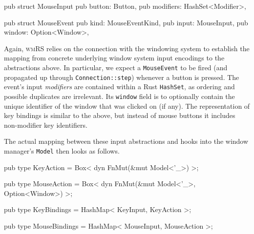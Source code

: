 \begin{rustblock}
  pub struct MouseInput {
    pub button: Button,
    pub modifiers: HashSet<Modifier>,
  }
\end{rustblock}

\begin{rustblock}
  pub struct MouseEvent {
    pub kind: MouseEventKind,
    pub input: MouseInput,
    pub window: Option<Window>,
  }
\end{rustblock}

Again,  \textsc{wmRS} relies  on the  connection  with the  windowing system  to
establish the mapping from concrete  underlying window system input encodings to
the abstractions  above. In  particular, we expect  a \texttt{MouseEvent}  to be
fired (and propagated up through \texttt{Connection::step}) whenever a button is
pressed.  The  event's input  \textit{modifiers}  are  contained within  a  Rust
\texttt{HashSet},  as  ordering  and  possible duplicates  are  irrelevant.  Its
\texttt{window}  field is  to optionally  contain the  unique identifier  of the
window  that was  clicked on  (if any).  The representation  of key  bindings is
similar to the above, but instead  of mouse buttons it includes non-modifier key
identifiers.

The actual  mapping between these input  abstractions and hooks into  the window
manager's \texttt{Model} then looks as follows.

\begin{rustblock}
  pub type KeyAction = Box<
    dyn FnMut(&mut Model<'_>)
  >;
\end{rustblock}
\begin{rustblock}
  pub type MouseAction = Box<
    dyn FnMut(&mut Model<'_>, Option<Window>)
  >;
\end{rustblock}
\begin{rustblock}
  pub type KeyBindings = HashMap<
    KeyInput, KeyAction
  >;
\end{rustblock}
\begin{rustblock}
  pub type MouseBindings = HashMap<
    MouseInput, MouseAction
  >;
\end{rustblock}


